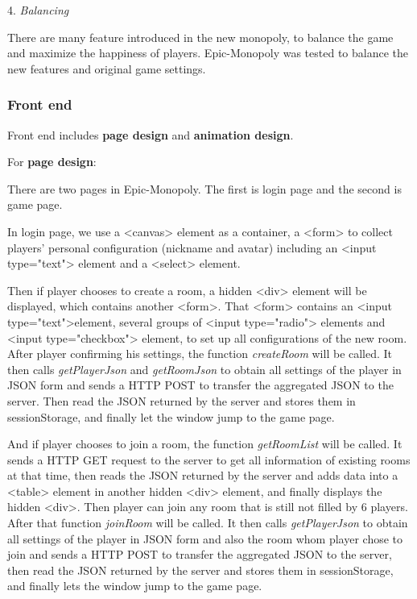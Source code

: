 \documentclass[a4paper,11pt]{article}
\begin{document}
4.	\emph{Balancing}

There are many feature introduced in the new monopoly, to balance the game and maximize the happiness of players. Epic-Monopoly was tested to balance the new features and original game settings.

\subsubsection{Front end}
Front end includes \textbf{page design} and \textbf{animation design}. 

For \textbf{page design}:

There are two pages in Epic-Monopoly. The first is login page and the second is game page. 
	
In login page, we use a \textless canvas\textgreater\; element as a container, a \textless form\textgreater\; to collect players' personal configuration (nickname and avatar) including an \textless input type="text"\textgreater\; element and a \textless select\textgreater\; element. 

Then if player chooses to create a room, a hidden \textless div\textgreater\; element will be displayed, which contains another \textless form\textgreater. That \textless form\textgreater\; contains an \textless input type="text"\textgreater\;element, several groups of \textless input type="radio"\textgreater\; elements and \textless input type="checkbox"\textgreater\; element, to set up all configurations of the new room. After player confirming his settings, the function \emph{createRoom} will be called. It then calls \emph{getPlayerJson} and \emph{getRoomJson} to obtain all settings of the player in JSON form and sends a HTTP POST to transfer the aggregated JSON to the server. Then read the JSON returned by the server and stores them in sessionStorage, and finally let the window jump to the game page.

And if player chooses to join a room, the function \emph{getRoomList} will be called. It sends a HTTP GET request to the server to get all information of existing rooms at that time, then reads the JSON returned by the server and adds data into a \textless table\textgreater\; element in another hidden \textless div\textgreater\; element, and finally displays the hidden \textless div\textgreater\;. Then player can join any room that is still not filled by $6$ players. After that function \emph{joinRoom} will be called. It then calls \emph{getPlayerJson} to obtain all settings of the player in JSON form and also the room whom player chose to join and sends a HTTP POST to transfer the aggregated JSON to the server, then read the JSON returned by the server and stores them in sessionStorage, and finally lets the window jump to the game page.
	
\end{document}
